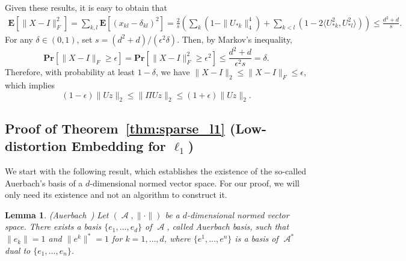 \documentclass[11pt]{article}
\newtheorem{lemma}{Lemma}
\DeclareMathOperator{\A}{\mathcal{A}}
\begin{document}
Given these results, it is easy to obtain that 
\begin{align*}
  \mathbf{E}[\|X - I\|_F^2] = \sum_{k, l} \mathbf{E}[(x_{kl}-\delta_{kl})^2]
  = \frac{2}{s} \left( \sum_k ( 1 - \|U_{*k}\|_4^4 ) + \sum_{k < l} ( 1- 2 \langle U^2_{*k}, U^2_{*l} \rangle) \right) \leq \frac{d^2+d}{s}.
\end{align*}
For any $\delta \in (0, 1)$, set $s = (d^2+d)/(\epsilon^2 \delta)$.
Then, by Markov's inequality,
\begin{equation*}
  \mathbf{Pr}[\|X - I\|_F \geq \epsilon] = \mathbf{Pr}[\|X-I\|_F^2 \geq \epsilon^2] \leq \frac{d^2+d}{\epsilon^2 s} = \delta.
\end{equation*}
Therefore, with probability at least $1-\delta$, we have $\|X - I\|_2 \leq \|X
- I\|_F \leq \epsilon$, which implies
\begin{equation*}
  (1-\epsilon) \|U z\|_2 \leq \|\Pi U z\|_2 \leq (1+\epsilon) \|U z\|_2.
\end{equation*}


\subsection{Proof of Theorem~\ref{thm:sparse_l1} (Low-distortion Embedding for $\ell_1$)}
\label{sec:proof_l1}

We start with the following result, which establishes the existence of the
so-called Auerbach's basis of a $d$-dimensional normed vector space.
For our proof, we will only need its existence and not an algorithm to construct
it.

\begin{lemma} 
  \label{lemma:auerbach}
  (Auerbach~\cite{auerbach1930area}) Let $(\A, \|\cdot\|)$ be a $d$-dimensional
  normed vector space.
  There exists a basis $\{e_1,\ldots,e_d\}$ of $\A$, called Auerbach basis, such
  that $\|e_k\| = 1$ and $\|e^k\|^* = 1$ for $k=1,\ldots,d$, where
  $\{e^1,\ldots,e^n\}$ is a basis of $\A^*$ dual to $\{e_1,\ldots,e_n\}$.
\end{lemma}
\end{document}
